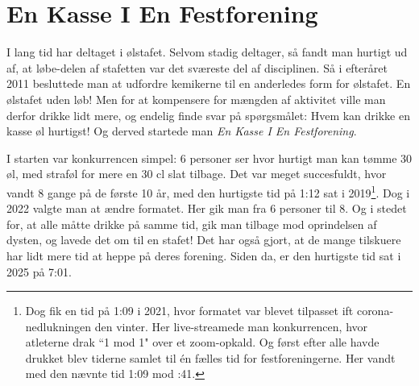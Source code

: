 \chapter{En Kasse I En Festforening}
I lang tid har \TKET deltaget i \alkymias ølstafet. Selvom \TKET stadig deltager, så fandt man hurtigt ud af, at løbe-delen af stafetten var det sværeste del af disciplinen. Så i efteråret 2011 besluttede man at udfordre kemikerne til en anderledes form for ølstafet. En ølstafet uden løb! Men for at kompensere for mængden af aktivitet ville man derfor drikke lidt mere, og endelig finde svar på spørgsmålet: Hvem kan drikke en kasse øl hurtigst! Og derved startede man \textit{En Kasse I En Festforening}.

I starten var konkurrencen simpel: 6 personer ser hvor hurtigt man kan tømme 30 øl, med straføl for mere en 30 cl slat tilbage. Det var meget succesfuldt, hvor \TKET vandt 8 gange på de første 10 år, med den hurtigste tid på 1:12 sat i 2019\footnote{Dog fik \TKET en tid på 1:09 i 2021, hvor formatet var blevet tilpasset ift corona-nedlukningen den vinter. Her live-streamede man konkurrencen, hvor atleterne drak ``1 mod 1" over et zoom-opkald. Og først efter alle havde drukket blev tiderne samlet til én fælles tid for festforeningerne. Her vandt \TKET med den nævnte tid 1:09 mod :41.}.
Dog i 2022 valgte man at ændre formatet. Her gik man fra 6 personer til 8. Og i stedet for, at alle måtte drikke på samme tid, gik man tilbage mod oprindelsen af dysten, og lavede det om til en stafet! Det har også gjort, at de mange tilskuere har lidt mere tid at heppe på deres forening. Siden da, er den hurtigste tid sat i 2025 på 7:01. 
